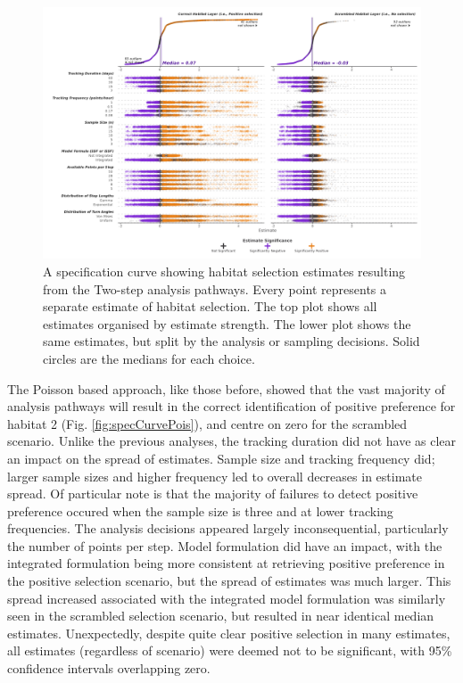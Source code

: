 \documentclass[10pt,a4paper]{article}
\begin{document}
\begin{figure}
\includegraphics[width=1\linewidth]{../figures/twoStep_specCurve} \caption{A specification curve showing habitat selection estimates resulting from the Two-step analysis pathways. Every point represents a separate estimate of habitat selection. The top plot shows all estimates organised by estimate strength. The lower plot shows the same estimates, but split by the analysis or sampling decisions. Solid circles are the medians for each choice.}\label{fig:specCurveTwoStep}
\end{figure}

The Poisson based approach, like those before, showed that the vast majority of analysis pathways will result in the correct identification of positive preference for habitat 2 (Fig. \ref{fig:specCurvePois}), and centre on zero for the scrambled scenario.
Unlike the previous analyses, the tracking duration did not have as clear an impact on the spread of estimates.
Sample size and tracking frequency did; larger sample sizes and higher frequency led to overall decreases in estimate spread.
Of particular note is that the majority of failures to detect positive preference occured when the sample size is three and at lower tracking frequencies.
The analysis decisions appeared largely inconsequential, particularly the number of points per step.
Model formulation did have an impact, with the integrated formulation being more consistent at retrieving positive preference in the positive selection scenario, but the spread of estimates was much larger.
This spread increased associated with the integrated model formulation was similarly seen in the scrambled selection scenario, but resulted in near identical median estimates.
Unexpectedly, despite quite clear positive selection in many estimates, all estimates (regardless of scenario) were deemed not to be significant, with 95\% confidence intervals overlapping zero.
\end{document}
